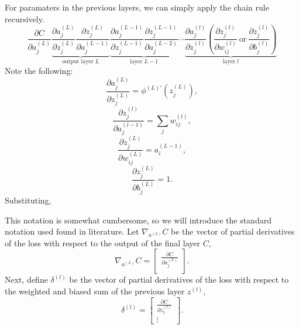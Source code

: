 \documentclass[12pt]{report}
\theoremstyle{definition}
\theoremstyle{remark}
\begin{document}
For paramaters in the previous layers, we can simply apply the chain rule recursively.
\begin{equation}\label{eq:big-chain}
    \frac{\partial C}{\partial a_j^{(L)}} \underbrace{\frac{\partial a_j^{(L)}}{\partial z_j^{(L)}} \frac{\partial z_j^{(L)}}{\partial a_j^{(L-1)}}}_{\text{output layer $L$}} \underbrace{\frac{\partial a_j^{(L-1)}}{\partial z_j^{(L-1)}} \frac{\partial z_j^{(L-1)}}{\partial a_{j}^{(L-2)}}}_{\text{layer $L-1$}} \cdots \underbrace{\frac{\partial a_j^{(l)}}{\partial z_j^{(l)}} \left(\frac{\partial z_j^{(l)}}{\partial w_{ij}^{(l)}} \ \text{or} \ \frac{\partial z_j^{(l)}}{\partial b_j^{(l)}}\right)}_{\text{layer $l$}}
\end{equation}
Note the following:
\begin{equation}\label{eq:partial-z-partial-a}
    \frac{\partial a_j^{(L)}}{\partial z_j^{(L)}} = \phi^{(L)\prime}(z_j^{(L)}),
\end{equation}
\begin{equation}
    \frac{\partial z_j^{(l)}}{\partial a_{j}^{(l-1)}} = \sum_j w_{ij}^{(l)},
\end{equation}
\begin{equation}
    \frac{\partial z_j^{(L)}}{\partial w_{ij}^{(L)}} = a_i^{(L-1)},
\end{equation}
\begin{equation}
    \frac{\partial z_j^{(L)}}{\partial b_j^{(L)}} = 1.
\end{equation}
Substituting,

This notation is somewhat cumbersome, so we will introduce the standard notation used found in literature. Let $\nabla_{a^{(L)}}C$ be the vector of partial derivatives of the loss with respect to the output of the final layer $C$,
\begin{equation}
    \nabla_{a^{(L)}}C = \begin{bmatrix}
        \frac{\partial C}{\partial a_j^{(L)}} \\
    \end{bmatrix}.
\end{equation}
Next, define $\delta^{(l)}$ be the vector of partial derivatives of the loss with respect to the weighted and biased sum of the previous layer $z^{(l)}$,
\begin{equation}
    \delta^{(l)} = \begin{bmatrix}
        \frac{\partial C}{\partial z_1^{(l)}} \\
        \vdots
    \end{bmatrix}.
\end{equation}
\end{document}

